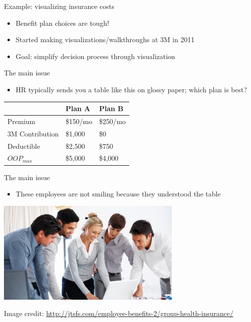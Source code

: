 \documentclass[sans,aspectratio=169,presentation,bigger,fleqn]{beamer}
\begin{document}
\begin{frame}[label=sec-9]{Example: visualizing insurance costs}
\begin{itemize}
\item Benefit plan choices are tough!
\item Started making visualizations/walkthroughs at 3M in 2011
\item Goal: simplify decision process through visualization
\end{itemize}
\end{frame}
\begin{frame}[label=sec-10]{The main issue}
\begin{itemize}
\item HR typically sends you a table like this on glossy paper; which plan is best?
\end{itemize}

\begin{center}
\begin{tabular}{lll}
\toprule
 & Plan A & Plan B\\
\midrule
Premium & \$150/mo & \$250/mo\\
3M Contribution & \$1,000 & \$0\\
Deductible & \$2,500 & \$750\\
\(OOP_{max}\) & \$5,000 & \$4,000\\
\bottomrule
\end{tabular}
\end{center}
\end{frame}
\begin{frame}[label=sec-11]{The main issue}
\begin{itemize}
\item These employees are not smiling because they understood the table
\end{itemize}

\begin{center}
\includegraphics[height=5cm]{./img/choosing-insurance.jpg}
\end{center}

\tiny
Image credit: \url{http://jtsfs.com/employee-benefits-2/group-health-insurance/}
\end{frame}
\end{document}
